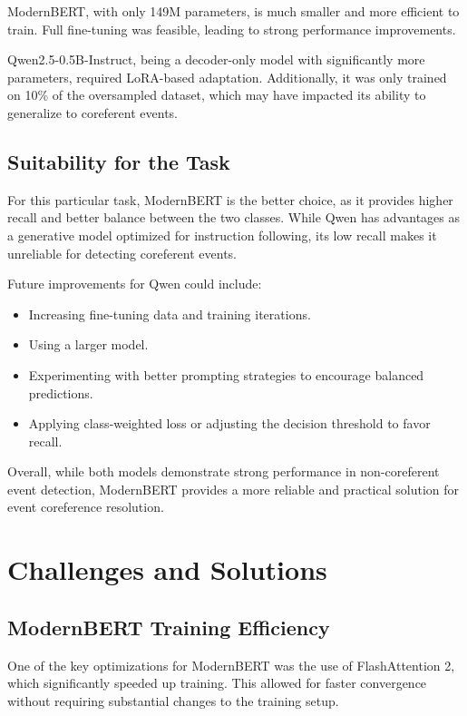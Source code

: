 \documentclass[12pt,a4paper]{article}
\begin{document}
ModernBERT, with only 149M parameters, is much smaller and more efficient to train. Full fine-tuning was feasible, leading to strong performance improvements. 

Qwen2.5-0.5B-Instruct, being a decoder-only model with significantly more parameters, required LoRA-based adaptation. Additionally, it was only trained on 10\% of the oversampled dataset, which may have impacted its ability to generalize to coreferent events.

\subsection{Suitability for the Task}

For this particular task, ModernBERT is the better choice, as it provides higher recall and better balance between the two classes. While Qwen has advantages as a generative model optimized for instruction following, its low recall makes it unreliable for detecting coreferent events.

Future improvements for Qwen could include:
\begin{itemize}
    \item Increasing fine-tuning data and training iterations.
    \item Using a larger model.
    \item Experimenting with better prompting strategies to encourage balanced predictions.
    \item Applying class-weighted loss or adjusting the decision threshold to favor recall.
\end{itemize}

Overall, while both models demonstrate strong performance in non-coreferent event detection, ModernBERT provides a more reliable and practical solution for event coreference resolution.

\section{Challenges and Solutions}

\subsection{ModernBERT Training Efficiency}

One of the key optimizations for ModernBERT was the use of FlashAttention 2, which significantly speeded up training. This allowed for faster convergence without requiring substantial changes to the training setup.
\end{document}
